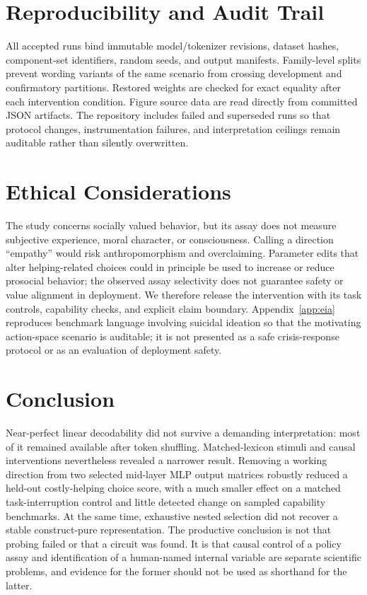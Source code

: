 \documentclass[10pt,twocolumn]{article}
\begin{document}
\section{Reproducibility and Audit Trail}

All accepted runs bind immutable model/tokenizer revisions, dataset hashes,
component-set identifiers, random seeds, and output manifests. Family-level
splits prevent wording variants of the same scenario from crossing development
and confirmatory partitions. Restored weights are checked for exact equality
after each intervention condition. Figure source data are read directly from
committed JSON artifacts. The repository includes failed and superseded runs so
that protocol changes, instrumentation failures, and interpretation ceilings
remain auditable rather than silently overwritten.

\section{Ethical Considerations}
\label{sec:ethics}

The study concerns socially valued behavior, but its assay does not measure
subjective experience, moral character, or consciousness. Calling a direction
``empathy'' would risk anthropomorphism and overclaiming. Parameter edits that
alter helping-related choices could in principle be used to increase or reduce
prosocial behavior; the observed assay selectivity does not guarantee safety
or value alignment in deployment. We therefore release the intervention with
its task controls, capability checks, and explicit claim boundary.
Appendix~\ref{app:eia} reproduces benchmark language involving suicidal
ideation so that the motivating action-space scenario is auditable; it is not
presented as a safe crisis-response protocol or as an evaluation of deployment
safety.

\section{Conclusion}

Near-perfect linear decodability did not survive a demanding interpretation:
most of it remained available after token shuffling. Matched-lexicon stimuli
and causal interventions nevertheless revealed a narrower result. Removing a
working direction from two selected mid-layer MLP output matrices robustly
reduced a held-out costly-helping choice score, with a much smaller effect on a
matched task-interruption control and little detected change on sampled
capability benchmarks. At the same time, exhaustive nested selection did not
recover a stable construct-pure representation. The productive conclusion is
not that probing failed or that a circuit was found. It is that causal control
of a policy assay and identification of a human-named internal variable are
separate scientific problems, and evidence for the former should not be used
as shorthand for the latter.
\end{document}
